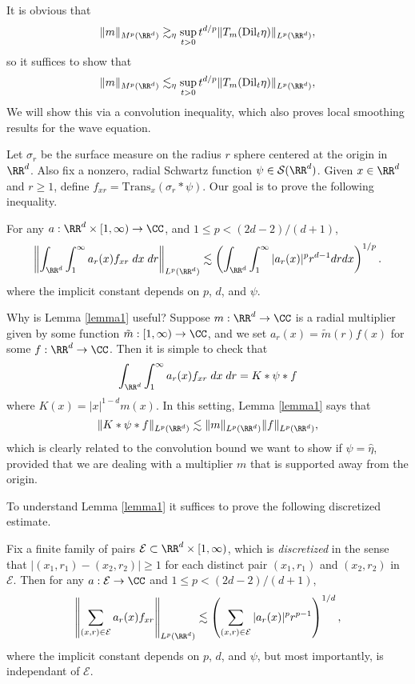 It is obvious that
%
\[ \| m \|_{M^p(\RR^d)} \gtrsim_\eta \sup_{t > 0} t^{d/p} \| T_m(\text{Dil}_t \eta) \|_{L^p(\RR^d)}, \]
%
so it suffices to show that
%
\[ \| m \|_{M^p(\RR^d)} \lesssim_\eta \sup_{t > 0} t^{d/p} \| T_m(\text{Dil}_t \eta) \|_{L^p(\RR^d)}, \]
%
We will show this via a convolution inequality, which also proves local smoothing results for the wave equation.

Let $\sigma_r$ be the surface measure on the radius $r$ sphere centered at the origin in $\RR^d$. Also fix a nonzero, radial Schwartz function $\psi \in \mathcal{S}(\RR^d)$. Given $x \in \RR^d$ and $r \geq 1$, define $f_{x r} = \text{Trans}_x (\sigma_r * \psi)$. Our goal is to prove the following inequality.

\begin{lemma} \label{lemma1}
    For any $a : \RR^d \times [1,\infty) \to \CC$, and $1 \leq p < (2d - 2)/(d+1)$,
    \[ \left\| \int_{\RR^d} \int_1^\infty a_r(x) f_{x r}\; dx\; dr \right\|_{L^p(\RR^d)} \lesssim \left( \int_{\RR^d} \int_1^\infty |a_r(x)|^p r^{d-1} dr dx \right)^{1/p}. \]
    where the implicit constant depends on $p$, $d$, and $\psi$.
\end{lemma}

Why is Lemma \ref{lemma1} useful? Suppose $m: \RR^d \to \CC$ is a radial multiplier given by some function $\tilde{m}: [1,\infty) \to \CC$, and we set $a_r(x) = \tilde{m}(r) f(x)$ for some $f: \RR^d \to \CC$. Then it is simple to check that
%
\[ \int_{\RR^d} \int_1^\infty a_r(x) f_{x r}\; dx\; dr = K * \psi * f \]
%
where $K(x) = |x|^{1-d} m(x)$. In this setting, Lemma \ref{lemma1} says that
%
\[ \| K * \psi * f \|_{L^p(\RR^d)} \lesssim \| m \|_{L^p(\RR^d)} \| f \|_{L^p(\RR^d)}, \]
%
which is clearly related to the convolution bound we want to show if $\psi = \widehat{\eta}$, provided that we are dealing with a multiplier $m$ that is supported away from the origin.

To understand Lemma \ref{lemma1} it suffices to prove the following discretized estimate.

\begin{theorem} \label{lemma2}
    Fix a finite family of pairs $\mathcal{E} \subset \RR^d \times [1,\infty)$, which is \emph{discretized} in the sense that $|(x_1,r_1) - (x_2,r_2)| \geq 1$ for each distinct pair $(x_1,r_1)$ and $(x_2,r_2)$ in $\mathcal{E}$. Then for any $a: \mathcal{E} \to \CC$ and $1 \leq p < (2d - 2)/(d+1)$, 
    \[ \left\| \sum_{(x,r) \in \mathcal{E}} a_r(x) f_{x r} \right\|_{L^p(\RR^d)} \lesssim \left( \sum_{(x,r) \in \mathcal{E}} |a_r(x)|^p r^{p-1} \right)^{1/d}, \]
    where the implicit constant depends on $p$, $d$, and $\psi$, but most importantly, is independant of $\mathcal{E}$.
\end{theorem}

